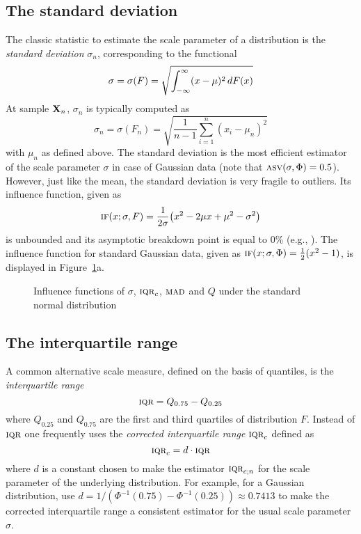 \subsection{The standard deviation}

The classic statistic to estimate the scale parameter of a distribution 
is the \emph{standard deviation} $\sigma_n$, 
corresponding to the functional 
\[
    \sigma = \sigma(F) = \sqrt{\int_{-\infty}^\infty (x-\mu)^2 \mathop{}\!d F(x)}
\]
At sample $\mathbf X_n$, $\sigma_n$ is typically computed as                   
\[
    \sigma_n = \sigma(F_n) = \sqrt{\frac{1}{n-1} \sum_{i=1}^n (x_i-\mu_n)^2}
\]
with $\mu_n$ as defined above. The standard deviation is the most efficient
estimator of the scale parameter $\sigma$ in case of Gaussian data (note that
$\stsc{ASV}(\sigma, \Phi)=0.5$).                                               
However, just like the mean, the standard
deviation is very fragile to outliers. Its influence function, given as
\[
    \stsc{IF}(x; \sigma, F) = \frac{1}{2\sigma} \left(x^2 - 2\mu x + \mu^2 - \sigma^2\right)
\]
is unbounded and its asymptotic breakdown point is equal to 0\% (e.g.,
\citealp[p. 1275]{rousseeuw:croux:1993}). The influence function for standard
Gaussian data, given as $\stsc{IF}(x; \sigma, \Phi) = \frac{1}{2} (x^2 - 1)$,
is displayed in Figure~\ref{fig:stat:IF_scale}a.



\begin{figure}[h!]
    \centering
    \caption{Influence functions of $\sigma$, $\stsc{IQR}_c$, $\stsc{MAD}$ and $Q$ under the standard normal distribution}
    \label{fig:stat:IF_scale}
\end{figure}


\subsection{The interquartile range}

A common alternative scale measure, defined on the basis of quantiles, is the
\emph{interquartile range}
\[
    \stsc{IQR}= Q_{0.75} - Q_{0.25}
\]
where $Q_{0.25}$ and $Q_{0.75}$ are the first and third quartiles of
distribution $F$. Instead of $\stsc{IQR}$ one frequently uses the
\emph{corrected interquartile range} $\stsc{IQR}_c$ defined as
\[
    \stsc{IQR}_c = d \cdot \stsc{IQR}
\]
where $d$ is a constant chosen to make the estimator $\stsc{IQR}_{c;n}$
 for the scale parameter of the
underlying distribution. For example, for a Gaussian distribution, use $d =
1 / \left(\Phi^{-1}(0.75) - \Phi^{-1}(0.25)\right) \approx 0.7413$ to make the
corrected interquartile range a consistent estimator for the usual scale
parameter $\sigma$.


